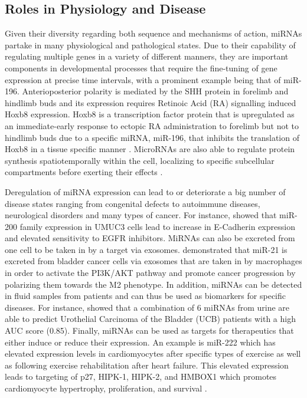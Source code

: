 \documentclass[en,ack]{dimscthesis}
\begin{document}
\subsection{Roles in Physiology and Disease} \label{Roles in Physiology and Disease}
\par Given their diversity regarding both sequence and mechanisms of action, miRNAs partake in many physiological and pathological states. Due to their capability of regulating multiple genes in a variety of different manners, they are important components in developmental processes that require the fine-tuning of gene expression at precise time intervals, with a prominent example being that of miR-196. Anterioposterior polarity is mediated by the SHH protein in forelimb and hindlimb buds and its expression requires Retinoic Acid (RA) signalling induced Hoxb8 expression. Hoxb8 is a transcription factor protein that is upregulated as an immediate-early response to ectopic RA administration to forelimb but not to hindlimb buds due to a specific miRNA, miR-196, that inhibits the translation of Hoxb8 in a tissue specific manner \parencite{hornsteinMicroRNAMiR196Acts2005}. MicroRNAs are also able to regulate protein synthesis spatiotemporally within the cell, localizing to specific subcellular compartments before exerting their effects \parencite{corbinRoleMicroRNAsSynaptic2009}. 
\par Deregulation of miRNA expression can lead to or deteriorate a big number of disease states ranging from congenital defects to autoimmune diseases, neurological disorders and many types of cancer. For instance, \cite{adamMiR200ExpressionRegulates2009} showed that miR-200 family expression in UMUC3 cells lead to increase in E-Cadherin expression and elevated sensitivity to EGFR inhibitors. MiRNAs can also be excreted from one cell to be taken in by a target via exosomes. \cite{linBladderCancerCellsecreted2019} demonstrated that miR-21 is excreted from bladder cancer cells via exosomes that are taken in by macrophages in order to activate the PI3K/AKT pathway and promote cancer progression by polarizing them towards the M2 phenotype. In addition, miRNAs can be detected in fluid samples from patients and can thus be used as biomarkers for specific diseases. For instance, \cite{sapreUrinaryMicroRNASignature2016} showed that a combination of 6 miRNAs from urine are able to predict Urothelial Carcinoma of the Bladder (UCB) patients with a high AUC score (0.85). Finally, miRNAs can be used as targets for therapeutics that either induce or reduce their expression. An example is miR-222 which has elevated expression levels in cardiomyocytes after specific types of exercise as well as following exercise rehabilitation after heart failure. This elevated expression leads to targeting of p27, HIPK-1, HIPK-2, and HMBOX1 which promotes cardiomyocyte hypertrophy, proliferation, and survival \parencite{dingMiR222CardiovascularDiseases2017}. 
\end{document}
